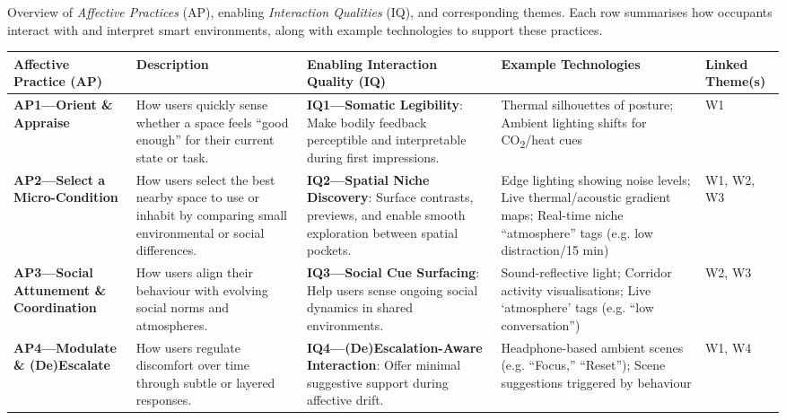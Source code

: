 \begin{maintable}[tbp]
\caption{Overview of \textit{Affective Practices} (AP), enabling \textit{Interaction Qualities} (IQ), and corresponding themes. Each row summarises how occupants interact with and interpret smart environments, along with example technologies to support these practices.}
\fontsize{7.8}{9.2}\selectfont
\setlength{\tabcolsep}{2.4pt}
\renewcommand{\arraystretch}{1.04}
\begin{tabularx}{\linewidth}
{@{}
p{.20\linewidth}
p{.20\linewidth}
p{.20\linewidth}
p{.20\linewidth}
>{\centering\arraybackslash}p{.045\linewidth}@{}
}
\toprule
\textbf{Affective Practice (AP)} & \textbf{Description} & \textbf{Enabling Interaction Quality (IQ)} & \textbf{Example Technologies} & \textbf{Linked Theme(s)} \\
\midrule

\textbf{AP1---Orient \& Appraise} & How users quickly sense whether a space feels ``good enough'' for their current state or task. & \textbf{IQ1---Somatic Legibility}: Make bodily feedback perceptible and interpretable during first impressions. & 
Thermal silhouettes of posture;  
Ambient lighting shifts for CO\textsubscript{2}/heat cues & 
W1 \\

\textbf{AP2---Select a Micro-Condition} & How users select the best nearby space to use or inhabit by comparing small environmental or social differences. & \textbf{IQ2---Spatial Niche Discovery}: Surface contrasts, previews, and enable smooth exploration between spatial pockets. & 
Edge lighting showing noise levels; Live thermal/acoustic gradient maps; Real-time niche ``atmosphere'' tags (e.g. low distraction/15 min) & 
W1, W2, W3  \\

\textbf{AP3---Social Attunement \& Coordination} & How users align their behaviour with evolving social norms and atmospheres. & \textbf{IQ3---Social Cue Surfacing}: Help users sense ongoing social dynamics in shared environments. & 
Sound-reflective light; Corridor activity visualisations; Live ‘atmosphere’ tags (e.g. ``low conversation'') & 
W2, W3  \\

\textbf{AP4---Modulate \& (De)Escalate} & How users regulate discomfort over time through subtle or layered responses. & \textbf{IQ4---(De)Escalation-Aware Interaction}: Offer minimal suggestive support during affective drift. & 
Headphone-based ambient scenes (e.g. “Focus,” “Reset”);  
Scene suggestions triggered by behaviour & 
W1, W4  \\


\end{tabularx}
\end{maintable}
